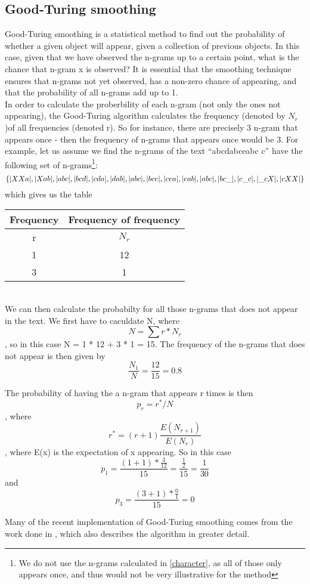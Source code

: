 \subsection{Good-Turing smoothing}
\label{Good-Turing}
Good-Turing smoothing is a statistical method to find out the probability of whether a given object will appear, given a collection of previous objects. In this case, given that we have observed the n-grams up to a certain point, what is the chance that n-gram x is observed? It is essential that the smoothing technique ensures that n-grams not yet observed, has a non-zero chance of appearing, and that the probability of all n-grams add up to 1.\\

In order to calculate the proberbility of each n-gram (not only the ones not appearing), the Good-Turing algorithm calculates the frequency (denoted by $N_r$)of all frequencies (denoted r). So for instance, there are precisely 3 n-gram that appears once - then the frequency of n-grams that appears once would be 3. For example, let us assume we find the n-grams of the text ``abcdabceabc c'' have the following set of n-grams\footnote{We do not use the n-grams calculated in \ref{character}, as all of those only appears once, and thus would not be very illustrative for the method}:\\
$$
\{|XXa|, |Xab|, |abc|, |bcd|, |cda|, |dab|, |abc|, |bce|, |cea|, |eab|, |abc|, |bc\_|, |c\_c|, |\_cX|, |cXX| \}
$$
which gives us the table\\
\begin{tabular}{|cc|}
\hline
Frequency & Frequency of frequency \\
\hline
r & $N_{r}$ \\
1 & 12\\
3 & 1\\
\hline
\end{tabular}
\\
We can then calculate the probabilty for all those n-grams that does not appear in the text. We first have to caculdate N, where 
$$
N = \sum r * N_r
$$
, so in this case N = 1 * 12 + 3 * 1 = 15. The frequency of the n-grams that does not appear is then given by 
$$
\frac{N_1}{N} = \frac{12}{15} = 0.8
$$

The probability of having the a n-gram that appears r times is then 
$$p_r = r^*/N$$
, where 
$$r^* = (r+1)\frac{E(N_{r+1})}{E(N_r)}$$
, where E(x) is the expectation of x appearing. So in this case 
$$p_1 = \frac{(1 + 1) * \frac{3}{12}}{15} = \frac{\frac{1}{2}}{15} = \frac{1}{30}$$ and  
$$p_3 = \frac{(3 + 1) * \frac{0}{1}}{15} = 0$$


Many of the recent implementation of Good-Turing smoothing comes from the work done in \cite{Gale94good-turingsmoothing}, which also describes the algorithm in greater detail.
